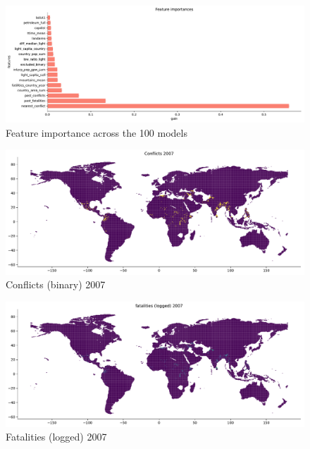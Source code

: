 \documentclass[a4paper]{article}
\begin{document}
\begin{figure}[!htb]
	\centering
	\includegraphics[scale=0.4]{feature_imp_out_20.pdf}
    \caption{\footnotesize{Feature importance across the 100 models}}%
\end{figure}

\begin{figure}[!htb]
	\centering
	\includegraphics[scale=0.4]{conflicts_2007.pdf}
    \caption{\footnotesize{Conflicts (binary) 2007}}%
\end{figure}

\begin{figure}[!htb]
	\centering
	\includegraphics[scale=0.4]{log_conflicts_2007.pdf}
    \caption{\footnotesize{Fatalities (logged) 2007}}%
\end{figure}
\end{document}
